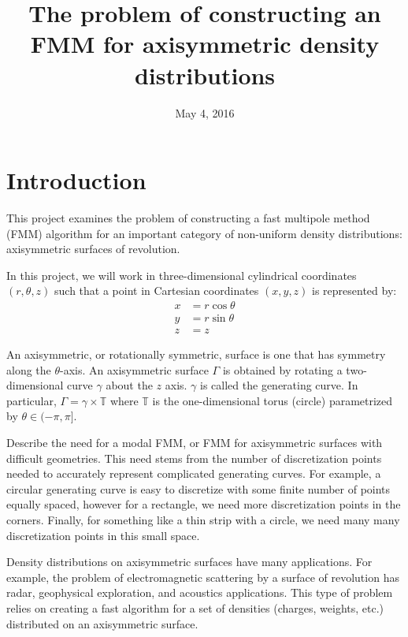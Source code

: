 \documentclass[11pt, oneside]{article}   	%
\title{The problem of constructing an FMM for axisymmetric density distributions}
\date{May 4, 2016}
\begin{document}
\maketitle

\section{Introduction}
This project examines the problem of constructing a fast multipole method (FMM) algorithm for an important category of non-uniform density distributions: axisymmetric surfaces of revolution.

In this project, we will work in three-dimensional cylindrical coordinates $(r,\theta,z)$ such that a point in Cartesian coordinates $(x,y,z)$ is represented by:
\begin{align*}
x &= r\cos\theta\\
y &= r\sin\theta\\
z &= z
\end{align*}

An axisymmetric, or rotationally symmetric, surface is one that has symmetry along the $\theta$-axis. An axisymmetric surface $\Gamma$ is obtained by rotating a two-dimensional curve $\gamma$ about the $z$ axis. $\gamma$ is called the generating curve. In particular, $\Gamma=\gamma\times\mathbb{T}$ where $\mathbb{T}$ is the one-dimensional torus (circle) parametrized by $\theta\in(-\pi,\pi]$.

Describe the need for a modal FMM, or FMM for axisymmetric surfaces with difficult geometries. This need stems from the number of discretization points needed to accurately represent complicated generating curves. For example, a circular generating curve is easy to discretize with some finite number of points equally spaced, however for a rectangle, we need more discretization points in the corners. Finally, for something like a thin strip with a circle, we need many many discretization points in this small space.

Density distributions on axisymmetric surfaces have many applications. For example, the problem of electromagnetic scattering by a surface of revolution has radar, geophysical exploration, and acoustics applications. This type of problem relies on creating a fast algorithm for a set of densities (charges, weights, etc.) distributed on an axisymmetric surface.
\end{document}
